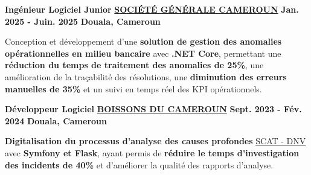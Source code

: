 

\begin{cventries}
  \cventry
    {\textbf{Ing\'enieur Logiciel Junior}} %
    {\textbf{\href{https://particuliers.societegenerale.cm/fr/}{SOCIÉTÉ GÉNÉRALE CAMEROUN}}} %
    {\textbf{Jan. 2025 - Juin. 2025}} %
    {\textbf{Douala, Cameroun}} %
    {
      \begin{cvitems} %
        \item {Conception et développement d'une \textbf{solution de gestion des anomalies opérationnelles en milieu bancaire} avec \textbf{.NET Core}, permettant une \textbf{réduction du temps de traitement des anomalies de 25\%}, une amélioration de la traçabilité des résolutions,  une \textbf{diminution des erreurs manuelles de 35\%} et un suivi en temps réel des KPI opérationnels.}
      \end{cvitems}
    }
  \cventry
    {\textbf{Développeur Logiciel}} %
    {\textbf{\href{https://boissonsducameroun.com/}{BOISSONS DU CAMEROUN}}} %
    {\textbf{Sept. 2023 - Fév. 2024}} %
    {\textbf{Douala, Cameroun}} %
    {
      \begin{cvitems} %
        \item {\textbf{Digitalisation du processus d'analyse des causes profondes} \href{https://www.dnv.com/energy/services/international-sustainability-rating-system/systematic-cause-analysis-techniques/}{SCAT - DNV} avec \textbf{Symfony et Flask}, ayant permis de \textbf{réduire le temps d'investigation des incidents de 40\%} et d'améliorer la qualité des rapports d'analyse.}

\end{cvitems}}
\end{cventries}
